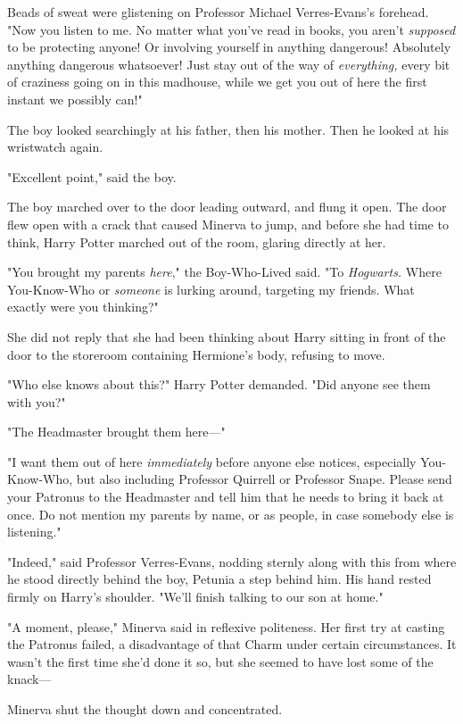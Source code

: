 Beads of sweat were glistening on Professor Michael Verres-Evans's forehead.
"Now you listen to me. No matter what you've read in books, you aren't
\emph{supposed} to be protecting anyone! Or involving yourself in anything
dangerous! Absolutely anything dangerous whatsoever! Just stay out of the way
of \emph{everything,} every bit of craziness going on in this madhouse, while
we get you out of here the first instant we possibly can!"

The boy looked searchingly at his father, then his mother. Then he looked at
his wristwatch again.

"Excellent point," said the boy.

The boy marched over to the door leading outward, and flung it open.
\later
The door flew open with a crack that caused Minerva to jump,
and before she had time to think, Harry Potter marched out of the room, glaring
directly at her.

"You brought my parents \emph{here}," the Boy-Who-Lived said. "To
\emph{Hogwarts.} Where You-Know-Who or \emph{someone} is lurking around,
targeting my friends. What exactly were you thinking?"

She did not reply that she had been thinking about Harry sitting in front of
the door to the storeroom containing Hermione's body, refusing to move.

"Who else knows about this?" Harry Potter demanded. "Did anyone see them with
you?"

"The Headmaster brought them here---"

"I want them out of here \emph{immediately} before anyone else notices,
especially You-Know-Who, but also including Professor Quirrell or Professor
Snape. Please send your Patronus to the Headmaster and tell him that he needs
to bring it back at once. Do not mention my parents by name, or as people, in
case somebody else is listening."

"Indeed," said Professor Verres-Evans, nodding sternly along with this from
where he stood directly behind the boy, Petunia a step behind him. His hand
rested firmly on Harry's shoulder. "We'll finish talking to our son at home."

"A moment, please," Minerva said in reflexive politeness. Her first try at
casting the Patronus failed, a disadvantage of that Charm under certain
circumstances. It wasn't the first time she'd done it so, but she seemed to
have lost some of the knack---

Minerva shut the thought down and concentrated.

